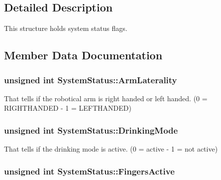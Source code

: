 \subsection{Detailed Description}
This structure holds system status flags. 

\subsection{Member Data Documentation}
\subsubsection[{\texorpdfstring{Arm\+Laterality}{ArmLaterality}}]{\setlength{\rightskip}{0pt plus 5cm}unsigned int System\+Status\+::\+Arm\+Laterality}\hypertarget{struct_system_status_a9c587e996336850e8b89b66194fa575d}{}\label{struct_system_status_a9c587e996336850e8b89b66194fa575d}


That tells if the robotical arm is right handed or left handed. (0 = R\+I\+G\+H\+T\+H\+A\+N\+D\+ED -\/ 1 = L\+E\+F\+T\+H\+A\+N\+D\+ED) 

\subsubsection[{\texorpdfstring{Drinking\+Mode}{DrinkingMode}}]{\setlength{\rightskip}{0pt plus 5cm}unsigned int System\+Status\+::\+Drinking\+Mode}\hypertarget{struct_system_status_a2b07e0f791db9e94312adc4f8df5f2a0}{}\label{struct_system_status_a2b07e0f791db9e94312adc4f8df5f2a0}


That tells if the drinking mode is active. (0 = active -\/ 1 = not active) 

\subsubsection[{\texorpdfstring{Fingers\+Active}{FingersActive}}]{\setlength{\rightskip}{0pt plus 5cm}unsigned int System\+Status\+::\+Fingers\+Active}\hypertarget{struct_system_status_ac7a9d66164763c99d7164419724cc71b}{}\label{struct_system_status_ac7a9d66164763c99d7164419724cc71b}


